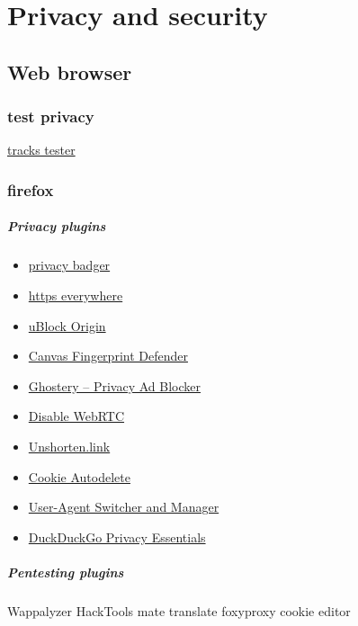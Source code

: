 \part{Privacy and security}




%

\chapter{Web browser}

\section{test privacy}
\href{https://coveryourtracks.eff.org/}{tracks tester}


\section{firefox}
\subsubsection{Privacy plugins}
\begin{itemize}
    \item \href{https://addons.mozilla.org/en-US/firefox/addon/privacy-badger17/}{privacy badger}
    \item
        \href{https://addons.mozilla.org/en-US/firefox/addon/https-everywhere/}{https
        everywhere}
    \item 
        \href{https://addons.mozilla.org/en-US/firefox/addon/ublock-origin/}{uBlock
        Origin}
    \item
        \href{https://addons.mozilla.org/en-US/firefox/addon/canvas-fingerprint-defender/}{Canvas
        Fingerprint Defender}
    \item 
        \href{https://addons.mozilla.org/en-US/firefox/addon/ghostery/}{Ghostery
        – Privacy Ad Blocker}
    \item 
        \href{https://addons.mozilla.org/en-US/firefox/addon/happy-bonobo-disable-webrtc/}{Disable
        WebRTC}
    \item
        \href{https://addons.mozilla.org/en-US/firefox/addon/unshort-link/}{Unshorten.link}

    \item
        \href{https://addons.mozilla.org/en-US/firefox/addon/cookie-autodelete/}{Cookie
        Autodelete}
    \item 
        \href{https://addons.mozilla.org/en-US/firefox/addon/user-agent-string-switcher/}{User-Agent
        Switcher and Manager}
    \item 
        \href{https://addons.mozilla.org/en-US/firefox/addon/duckduckgo-for-firefox/}{DuckDuckGo
        Privacy Essentials}
\end{itemize}

\subsubsection{Pentesting plugins}

Wappalyzer
HackTools
mate translate
foxyproxy
cookie editor

